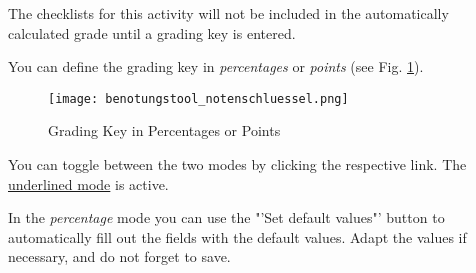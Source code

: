 The checklists for this activity will not be included in the automatically calculated grade until a grading key is entered.

You can define the grading key in {\em percentages} or {\em points} (see Fig. \ref{notenschluessel}).

\begin{figure}[ht]
\begin{center}
\texttt{[image: benotungstool\_notenschluessel.png]}
\caption{Grading Key in Percentages or Points}\label{notenschluessel}
\end{center}
\end{figure}

You can toggle between the two modes by clicking the respective link. The \underline{underlined mode} is active.

In the {\em percentage} mode you can use the "'Set default values"' button to automatically fill out the fields with the default values.
Adapt the values if necessary, and do not forget to save.

